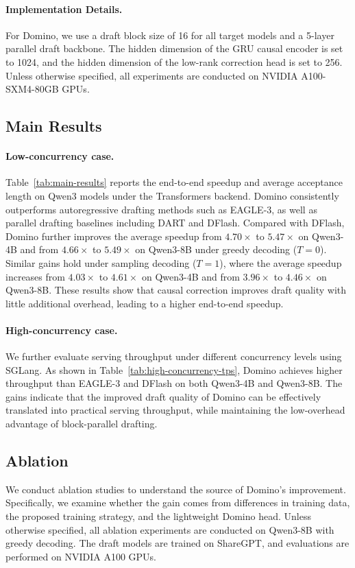 \documentclass{llmxive}
\begin{document}
\paragraph{Implementation Details.}
For Domino, we use a draft block size of 16 for all target models and a 5-layer parallel draft backbone. The hidden dimension of the GRU causal encoder is set to 1024, and the hidden dimension of the low-rank correction head is set to 256. Unless otherwise specified, all experiments are conducted on NVIDIA A100-SXM4-80GB GPUs. 

\subsection{Main Results}

\paragraph{Low-concurrency case.}
Table~\ref{tab:main-results} reports the end-to-end speedup and average acceptance length on Qwen3 models under the Transformers backend. Domino consistently outperforms autoregressive drafting methods such as EAGLE-3, as well as parallel drafting baselines including DART and DFlash. Compared with DFlash, Domino further improves the average speedup from \(4.70\times\) to \(5.47\times\) on Qwen3-4B and from \(4.66\times\) to \(5.49\times\) on Qwen3-8B under greedy decoding (\(T=0\)). Similar gains hold under sampling decoding (\(T=1\)), where the average speedup increases from \(4.03\times\) to \(4.61\times\) on Qwen3-4B and from \(3.96\times\) to \(4.46\times\) on Qwen3-8B. These results show that causal correction improves draft quality with little additional overhead, leading to a higher end-to-end speedup.
\paragraph{High-concurrency case.}
We further evaluate serving throughput under different concurrency levels using SGLang. As shown in Table~\ref{tab:high-concurrency-tps}, Domino achieves higher throughput than EAGLE-3 and DFlash on both Qwen3-4B and Qwen3-8B. The gains indicate that the improved draft quality of Domino can be effectively translated into practical serving throughput, while maintaining the low-overhead advantage of block-parallel drafting.


\subsection{Ablation}
\label{ablation}
We conduct ablation studies to understand the source of Domino's improvement. 
Specifically, we examine whether the gain comes from differences in training data, the proposed training strategy, and the lightweight Domino head. 
Unless otherwise specified, all ablation experiments are conducted on Qwen3-8B with greedy decoding. 
The draft models are trained on ShareGPT, and evaluations are performed on NVIDIA A100 GPUs.
\end{document}
